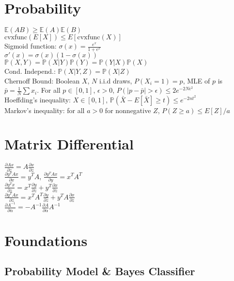 \section{Probability}

$\mathbb{E}(AB) \geq \mathbb{E}(A)\mathbb{E}(B)$\\
$\text{cvxfunc}(E[X]) \leq E[\text{cvxfunc}(X)]$\\
Sigmoid function: $\sigma(x) = \frac{e^x}{1+e^x}$\\
$\sigma'(x) = \sigma(x)(1-\sigma(x))$\\
$\mathbb{P}(X, Y) = \mathbb{P}(X|Y)\mathbb{P}(Y) = \mathbb{P}(Y|X)\mathbb{P}(X)$\\
Cond. Independ.: $\mathbb{P}(X|Y, Z) = \mathbb{P}(X|Z)$\\
Chernoff Bound: Boolean $X$, $N$ i.i.d draws, $P(X_i=1)=p$, MLE of $p$ is $\bar{p}=\frac{1}{N}\sum x_i$. For all $p \in [0, 1]$, $\epsilon > 0$, $P(|p-\bar{p}| > \epsilon) \leq 2e^{-2N\epsilon^2}$\\
Hoeffding's inequality: $X \in [0, 1]$, $\mathbb{P}(\bar{X} - E[\bar{X}] \geq t) \leq e^{-2nt^2}$\\
Markov's inequality: for all $a > 0$ for nonnegative $Z$, $P(Z \geq a) \leq E[Z]/a$

\section{Matrix Differential}

$\frac{\partial Ax}{\partial z} = A\frac{\partial x}{\partial z}$\\
$\frac{\partial y^T A x}{\partial x} = y^T A$, $\frac{\partial y^T A x}{\partial y} = x^T A^T$\\
$\frac{\partial y^T x}{\partial z} = x^T\frac{\partial y}{\partial z} + y^T \frac{\partial x}{\partial z}$\\
$\frac{\partial y^T A x}{\partial z} = x^T A^T \frac{\partial y}{\partial z} + y^T A\frac{\partial x}{\partial z}$\\
$\frac{\partial A^{-1}}{\partial \alpha} = -A^{-1}\frac{\partial A}{\partial \alpha} A^{-1}$

\section{Foundations}

\subsection*{Probability Model \& Bayes Classifier}

